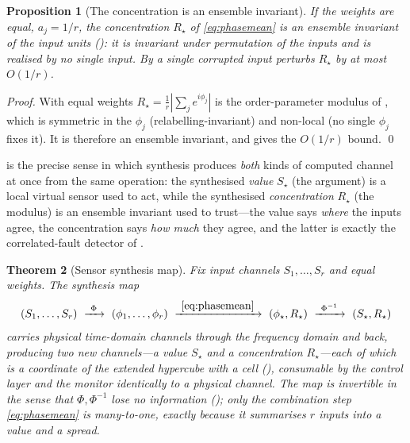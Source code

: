\documentclass[11pt,a4paper,twocolumn]{article}
\theoremstyle{thmstyle}
\newtheorem{theorem}{Theorem}[section]
\newtheorem{proposition}[theorem]{Proposition}
\theoremstyle{definition}
\theoremstyle{remark}
\newcommand{\Rstar}{R_{\star}}
\begin{document}
\begin{proposition}[The concentration is an ensemble invariant]
\label{prop:synth-invariant}
If the weights are equal, $a_j=1/r$, the concentration $\Rstar$ of
\eqref{eq:phasemean} is an ensemble invariant of the input units
\textup{(}\textup{)}: it is invariant under
permutation of the inputs and is realised by no single input. By
 a single corrupted input perturbs
$\Rstar$ by at most $O(1/r)$.
\end{proposition}

\begin{proof}
With equal weights $\Rstar=\frac1r|\sum_j e^{i\phi_j}|$ is the
order-parameter modulus of , which is symmetric
in the $\phi_j$ (relabelling-invariant) and non-local (no single $\phi_j$
fixes it). It is therefore an ensemble invariant, and
 gives the $O(1/r)$ bound. \qed
\end{proof}

 is the precise sense in which synthesis
produces \emph{both} kinds of computed channel at once from the same
operation: the synthesised \emph{value} $S_\star$ (the argument) is a
local virtual sensor used to act, while the synthesised
\emph{concentration} $\Rstar$ (the modulus) is an ensemble invariant
used to trust---the value says \emph{where} the inputs agree, the
concentration says \emph{how much} they agree, and the latter is exactly
the correlated-fault detector of .

\begin{theorem}[Sensor synthesis map]
\label{thm:synthesis}
Fix input channels $S_1,\dots,S_r$ and equal weights. The
\emph{synthesis map}
\begin{equation}
\label{eq:synth}
(S_1,\dots,S_r)\ \xrightarrow{\ \Phi\ }\ (\phi_1,\dots,\phi_r)\
\xrightarrow{\ \eqref{eq:phasemean}\ }\
(\phi_\star,\Rstar)\ \xrightarrow{\ \Phi^{-1}\ }\ (S_\star,\Rstar)
\end{equation}
carries physical time-domain channels through the frequency domain and
back, producing two new channels---a value $S_\star$ and a concentration
$\Rstar$---each of which is a coordinate of the extended hypercube
with a cell (\Cref{prop:switch-cells}), consumable by the control layer
and the monitor identically to a physical channel. The map is invertible
in the sense that $\Phi,\Phi^{-1}$ lose no information
(\Cref{prop:switch}); only the combination step \eqref{eq:phasemean} is
many-to-one, exactly because it summarises $r$ inputs into a value and a
spread.
\end{theorem}
\end{document}
